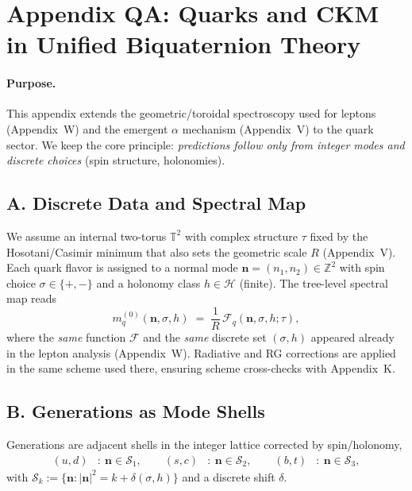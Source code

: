 \appendix
\section*{Appendix QA: Quarks and CKM in Unified Biquaternion Theory}

\paragraph{Purpose.}
This appendix extends the geometric/toroidal spectroscopy used for leptons (Appendix~W) and
the emergent $\alpha$ mechanism (Appendix~V) to the quark sector. We keep the core principle:
\emph{predictions follow only from integer modes and discrete choices} (spin structure, holonomies).

\subsection*{A. Discrete Data and Spectral Map}
We assume an internal two-torus $\mathbb{T}^2$ with complex structure $\tau$ fixed by the
Hosotani/Casimir minimum that also sets the geometric scale $R$ (Appendix~V).
Each quark flavor is assigned to a normal mode $\mathbf{n}=(n_1,n_2)\in\mathbb{Z}^2$ with spin choice
$\sigma\in\{+,-\}$ and a holonomy class $h\in\mathcal{H}$ (finite). The tree-level spectral map reads
\begin{equation}
  m^{(0)}_{q}(\mathbf n,\sigma,h) \;=\; \frac{1}{R}\,\mathcal{F}_q\!\left(\mathbf n,\sigma,h;\tau\right),
  \label{eq:QA:m_tree}
\end{equation}
where the \emph{same} function $\mathcal{F}$ and the \emph{same} discrete set $(\sigma,h)$
appeared already in the lepton analysis (Appendix~W). Radiative and RG corrections are applied
in the same scheme used there, ensuring scheme cross-checks with Appendix~K.




\subsection*{B. Generations as Mode Shells}
Generations are adjacent shells in the integer lattice corrected by spin/holonomy,
\begin{align}
  (u,d) &: \ \mathbf n\in\mathcal S_1,\qquad
  (s,c) &: \ \mathbf n\in\mathcal S_2,\qquad
  (b,t) &: \ \mathbf n\in\mathcal S_3,
\end{align}
with $\mathcal S_k := \{ \mathbf n : |\mathbf n|^2 = k + \delta(\sigma,h)\}$ and a discrete shift $\delta$.


